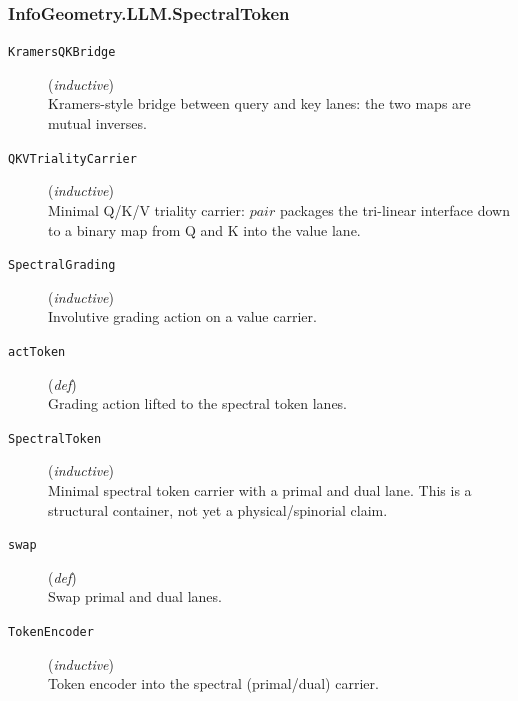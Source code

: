 \documentclass[11pt,a4paper]{article}
\begin{document}
\subsubsection*{InfoGeometry.LLM.SpectralToken}
\begin{description}
  \item[\texttt{KramersQKBridge}] (\textit{inductive}) \\ Kramers-style bridge between query and key lanes: 
the two maps are mutual inverses.
  \item[\texttt{QKVTrialityCarrier}] (\textit{inductive}) \\ Minimal Q/K/V triality carrier: 
$pair$ packages the tri-linear interface down to a binary map from Q and K 
into the value lane.
  \item[\texttt{SpectralGrading}] (\textit{inductive}) \\ Involutive grading action on a value carrier.
  \item[\texttt{actToken}] (\textit{def}) \\ Grading action lifted to the spectral token lanes.
  \item[\texttt{SpectralToken}] (\textit{inductive}) \\ Minimal spectral token carrier with a primal and dual lane. 
This is a structural container, not yet a physical/spinorial claim.
  \item[\texttt{swap}] (\textit{def}) \\ Swap primal and dual lanes.
  \item[\texttt{TokenEncoder}] (\textit{inductive}) \\ Token encoder into the spectral (primal/dual) carrier.
\end{description}
\end{document}
